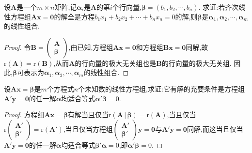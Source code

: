 \documentclass[lang=cn,newtx,10pt,scheme=chinese]{elegantbook}
\begin{document}
\begin{example}
设\(\boldsymbol{A}\)是一个\(m\times n\)矩阵,记\(\boldsymbol{\alpha}_i\)是\(\boldsymbol{A}\)的第\(i\)个行向量,\(\boldsymbol{\beta}=(b_1,b_2,\cdots,b_n)\). 求证:若齐次线性方程组\(\boldsymbol{A}\boldsymbol{x}=\boldsymbol{0}\)的解全是方程\(b_1x_1 + b_2x_2+\cdots + b_nx_n = 0\)的解,则\(\boldsymbol{\beta}\)是\(\boldsymbol{\alpha}_1,\boldsymbol{\alpha}_2,\cdots,\boldsymbol{\alpha}_m\)的线性组合.
\end{example}
\begin{proof}
令\(\boldsymbol{B}=\begin{pmatrix}
        \boldsymbol{A}\\
        \boldsymbol{\beta}
        \end{pmatrix}\),由已知,方程组\(\boldsymbol{A}\boldsymbol{x}=\boldsymbol{0}\)和方程组\(\boldsymbol{B}\boldsymbol{x}=\boldsymbol{0}\)同解,故\(\mathrm{r}(\boldsymbol{A})=\mathrm{r}(\boldsymbol{B})\),从而\(\boldsymbol{A}\)的行向量的极大无关组也是\(\boldsymbol{B}\)的行向量的极大无关组. 因此,\(\boldsymbol{\beta}\)可表示为\(\boldsymbol{\alpha}_1,\boldsymbol{\alpha}_2,\cdots,\boldsymbol{\alpha}_m\)的线性组合. 
\end{proof}

\begin{example}
设\(\boldsymbol{A}\boldsymbol{x}=\boldsymbol{\beta}\)是\(m\)个方程式\(n\)个未知数的线性方程组,求证:它有解的充要条件是方程组\(\boldsymbol{A}'\boldsymbol{y}=\boldsymbol{0}\)的任一解\(\boldsymbol{\alpha}\)均适合等式\(\boldsymbol{\alpha}'\boldsymbol{\beta}=0\).
\end{example}
\begin{proof}
    方程组\(\boldsymbol{A}\boldsymbol{x}=\boldsymbol{\beta}\)有解当且仅当\(\mathrm{r}\left( \boldsymbol{A}\,|\,\boldsymbol{\beta } \right) =\mathrm{r}(\boldsymbol{A})\),当且仅当\(\mathrm{r}\begin{pmatrix}
        \boldsymbol{A}'\\
        \boldsymbol{\beta}'
        \end{pmatrix}=\mathrm{r}(\boldsymbol{A}')\),当且仅当方程组\(\begin{pmatrix}
        \boldsymbol{A}'\\
        \boldsymbol{\beta}'
        \end{pmatrix}\boldsymbol{y}=\boldsymbol{0}\)与\(\boldsymbol{A}'\boldsymbol{y}=\boldsymbol{0}\)同解,而这当且仅当\(\boldsymbol{A}'\boldsymbol{y}=\boldsymbol{0}\)的任一解\(\boldsymbol{\alpha}\)均适合等式\(\boldsymbol{\beta}'\boldsymbol{\alpha}=0\),即\(\boldsymbol{\alpha}'\boldsymbol{\beta}=0\).
\end{proof}
\end{document}
